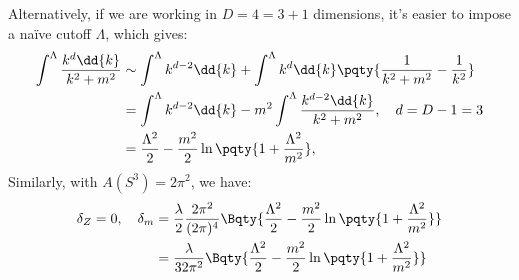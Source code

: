 \documentclass[a4paper
	,10pt
]{article}
\begin{document}
\begin{enumerate}
	Alternatively, if we are working in $D = 4 = 3 + 1$ dimensions, it's easier to impose a naïve cutoff $\Lambda$, which gives:
	\begin{equation}
	\begin{aligned}
		\int^\Lambda \frac{k^d \dd{k}}{k^2 + m^2}
		&\sim \int^\Lambda k^{d-2} \dd{k}
			+ \int^\Lambda k^d \dd{k}
				\pqty{
					\frac{1}{k^2 + m^2}
					- \frac{1}{k^2}
				} \\
		&= \int^\Lambda k^{d-2} \dd{k}
			- m^2 \int^\Lambda 
				\frac{k^{d-2} \dd{k}}{k^2 + m^2},
		\quad d = D - 1 = 3 \\
		&= \frac{\Lambda^2}{2}
			- \frac{m^2}{2} \ln \pqty{
				1 + \frac{\Lambda^2}{m^2}
			},
	\end{aligned}
	\end{equation}
	Similarly, with $A(S^3) = 2\pi^2$, we have:
	\begin{equation}
	\begin{aligned}
		\delta_Z = 0,
	\quad
		\delta_m
		&= \frac{\lambda}{2}
			\frac{2\pi^2}{(2\pi)^4} \Bqty{
				\frac{\Lambda^2}{2}
				- \frac{m^2}{2} \ln \pqty{
					1 + \frac{\Lambda^2}{m^2}
				}
			} \\
		&= \frac{\lambda}{32\pi^2} \Bqty{
				\frac{\Lambda^2}{2}
				- \frac{m^2}{2} \ln \pqty{
					1 + \frac{\Lambda^2}{m^2}
				}
			}
	\end{aligned}
	\end{equation}
	
\end{enumerate}
\printbibliography
\end{document}
